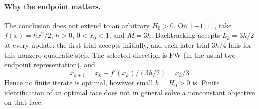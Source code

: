 \paragraph{Why the endpoint matters.}
The conclusion does not extend to an arbitrary $H_0>0$.
On $[-1,1]$, take $f(x)=h x^2/2$, $h>0$, $0<x_0<1$,
and $M=3h$. Backtracking accepts $L_k=3h/2$ at every update:
the first trial accepts initially, and each later trial $3h/4$
fails for this nonzero quadratic step. The selected direction
is FW (in the usual two-endpoint representation), and
\[
 x_{k+1}=x_k-f'(x_k)/(3h/2)=x_k/3.
\]
Hence no finite iterate is optimal, however small $h=H_0>0$ is.
Finite identification of an optimal face does not in general
solve a nonconstant objective on that face.
